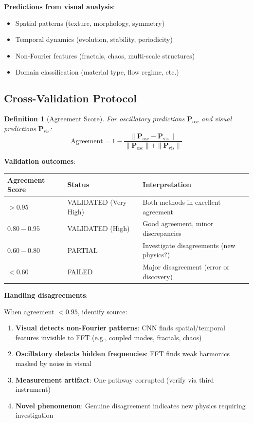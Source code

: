 \documentclass[12pt,a4paper]{article}
\newtheorem{definition}{Definition}
\begin{document}
\textbf{Predictions from visual analysis}:
\begin{itemize}
\item Spatial patterns (texture, morphology, symmetry)
\item Temporal dynamics (evolution, stability, periodicity)
\item Non-Fourier features (fractals, chaos, multi-scale structures)
\item Domain classification (material type, flow regime, etc.)
\end{itemize}

\subsection{Cross-Validation Protocol}

\begin{definition}[Agreement Score]
For oscillatory predictions $\mathbf{P}_{\text{osc}}$ and visual predictions $\mathbf{P}_{\text{vis}}$:
\begin{equation}
\text{Agreement} = 1 - \frac{\|\mathbf{P}_{\text{osc}} - \mathbf{P}_{\text{vis}}\|}{\|\mathbf{P}_{\text{osc}}\| + \|\mathbf{P}_{\text{vis}}\|}
\end{equation}
\end{definition}

\textbf{Validation outcomes}:

\begin{center}
\begin{tabular}{lll}
\toprule
\textbf{Agreement Score} & \textbf{Status} & \textbf{Interpretation} \\
\midrule
$> 0.95$ & VALIDATED (Very High) & Both methods in excellent agreement \\
$0.80 - 0.95$ & VALIDATED (High) & Good agreement, minor discrepancies \\
$0.60 - 0.80$ & PARTIAL & Investigate disagreements (new physics?) \\
$< 0.60$ & FAILED & Major disagreement (error or discovery) \\
\bottomrule
\end{tabular}
\end{center}

\textbf{Handling disagreements}:

When agreement $< 0.95$, identify source:
\begin{enumerate}
\item \textbf{Visual detects non-Fourier patterns}: CNN finds spatial/temporal features invisible to FFT (e.g., coupled modes, fractals, chaos)
\item \textbf{Oscillatory detects hidden frequencies}: FFT finds weak harmonics masked by noise in visual
\item \textbf{Measurement artifact}: One pathway corrupted (verify via third instrument)
\item \textbf{Novel phenomenon}: Genuine disagreement indicates new physics requiring investigation
\end{enumerate}
\end{document}
